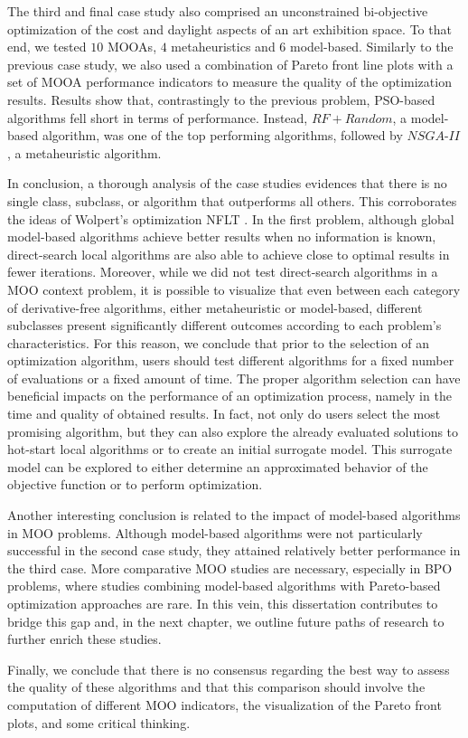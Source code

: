 The third and final case study also comprised an unconstrained bi-objective optimization of the cost and daylight aspects of an art exhibition space. To that end, we tested $10$ \acp{MOOA}, $4$ metaheuristics and $6$ model-based. Similarly to the previous case study, we also used a combination of Pareto front line plots with a set of \ac{MOOA} performance indicators to measure the quality of the optimization results. Results show that, contrastingly to the previous problem, \ac{PSO}-based algorithms fell short in terms of performance. Instead, $RF+Random$, a model-based algorithm, was one of the top performing algorithms, followed by $NSGA$-$II$, a metaheuristic algorithm. 

In conclusion, a thorough analysis of the case studies evidences that there is no single class, subclass, or algorithm that outperforms all others. This corroborates the ideas of Wolpert's optimization \ac{NFLT} \cite{Wolpert1997NFLT}. In the first problem, although global model-based algorithms achieve better results when no information is known, direct-search local algorithms are also able to achieve close to optimal results in fewer iterations. Moreover, while we did not test direct-search algorithms in a \ac{MOO} context problem, it is possible to visualize that even between each category of derivative-free algorithms, either metaheuristic or model-based, different subclasses present significantly different outcomes according to each problem's characteristics. For this reason, we conclude that prior to the selection of an optimization algorithm, users should test different algorithms for a fixed number of evaluations or a fixed amount of time. The proper algorithm selection can have beneficial impacts on the performance of an optimization process, namely in the time and quality of obtained results. In fact, not only do users select the most promising algorithm, but they can also explore the already evaluated solutions to hot-start local algorithms or to create an initial surrogate model. This surrogate model can be explored to either determine an approximated behavior of the objective function or to perform optimization. 

Another interesting conclusion is related to the impact of model-based algorithms in \ac{MOO} problems. Although model-based algorithms were not particularly successful in the second case study, they attained relatively better performance in the third case. More comparative \ac{MOO} studies are necessary, especially in \ac{BPO} problems, where studies combining model-based algorithms with Pareto-based optimization approaches are rare. In this vein, this dissertation contributes to bridge this gap and, in the next chapter, we outline future paths of research to further enrich these studies.

Finally, we conclude that there is no consensus regarding the best way to assess the quality of these algorithms and that this comparison should involve the computation of different \ac{MOO} indicators, the visualization of the Pareto front plots, and some critical thinking. 